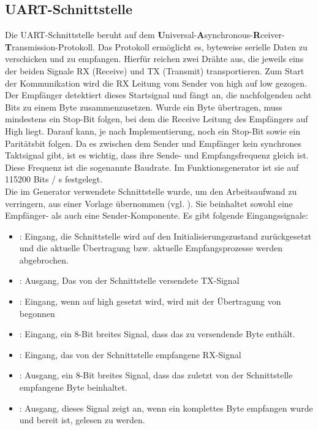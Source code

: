 \subsection{UART-Schnittstelle}
Die UART-Schnittstelle beruht auf dem
\textbf{U}niversal-\textbf{A}synchronous-\textbf{R}ceiver-\textbf{T}ransmission-Protokoll.
Das Protokoll ermöglicht es, byteweise serielle Daten zu verschicken und zu
empfangen. Hierfür reichen zwei Drähte aus, die jeweils eins der beiden Signale
RX (Receive) und TX (Transmit) transportieren. Zum Start der Kommunikation wird
die RX Leitung vom Sender von high auf low gezogen. Der Empfänger detektiert
dieses Startsignal und fängt an, die nachfolgenden acht Bits zu einem Byte
zusammenzusetzen.
Wurde ein Byte übertragen, muss mindestens ein Stop-Bit folgen, bei dem die Receive Leitung des Empfängers auf
High liegt. Darauf kann, je nach Implementierung, noch ein Stop-Bit sowie
ein Paritätsbit folgen. Da es zwischen dem Sender und Empfänger kein synchrones
Taktsignal gibt, ist es wichtig, dass ihre Sende- und Empfangsfrequenz gleich
ist. Diese Frequenz ist die sogenannte Baudrate. Im Funktionsgenerator ist sie
auf 115200 Bits / s festgelegt. \\
Die im Generator verwendete Schnittstelle wurde, um den Arbeitsaufwand zu verringern, aus einer Vorlage übernommen (vgl. \cite{digilent2020}).
Sie beinhaltet sowohl eine Empfänger- als auch eine Sender-Komponente. Es gibt folgende Eingangssignale:
\begin{itemize}
\item {}: Eingang, die Schnittstelle wird auf den Initialisierungszustand zurückgesetzt und die aktuelle Übertragung bzw. aktuelle Empfangsprozesse werden abgebrochen.

\item {}: Ausgang, Das von der Schnittstelle versendete TX-Signal 
  \item {}: Eingang, wenn  auf high gesetzt wird, wird mit der
    Übertragung von  begonnen
\item {}: Eingang, ein 8-Bit breites Signal, dass das zu versendende Byte enthält.

\item {}: Eingang, das von der Schnittstelle empfangene RX-Signal
\item {}: Ausgang, ein 8-Bit breites Signal, dass das zuletzt von der Schnittstelle empfangene Byte beinhaltet.
\item {}: Ausgang, dieses Signal zeigt an, wenn ein komplettes Byte
  empfangen wurde und bereit ist, gelesen zu werden.
\end{itemize}
  
